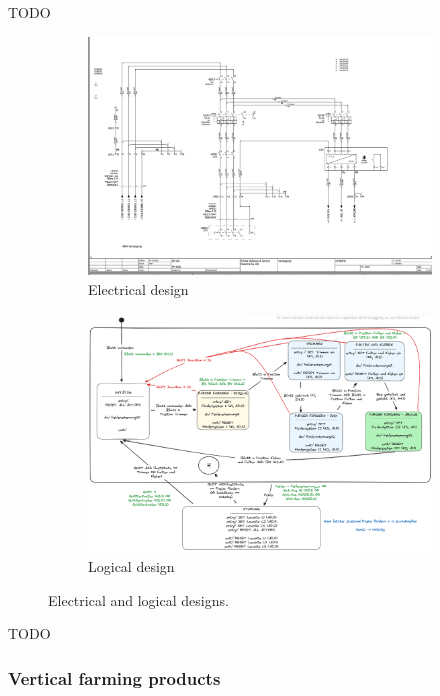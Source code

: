 \documentclass{PDS}
\begin{document}
TODO

\begin{figure}[htbp]
    \centering
    \begin{subfigure}[b]{0.45\textwidth}
        \centering
        \includegraphics[width=\textwidth]{./figures/paper_electric.png}
        \caption{Electrical design}
    \end{subfigure}
    \hfill
    \begin{subfigure}[b]{0.5\textwidth}
        \centering
        \includegraphics[width=\textwidth]{./figures/paper_control.png}
        \caption{Logical design}
    \end{subfigure}
    \caption{Electrical and logical designs.}
\end{figure}

TODO

\subsubsection{Vertical farming products}
\label{sec:master-product-classical}
\end{document}
